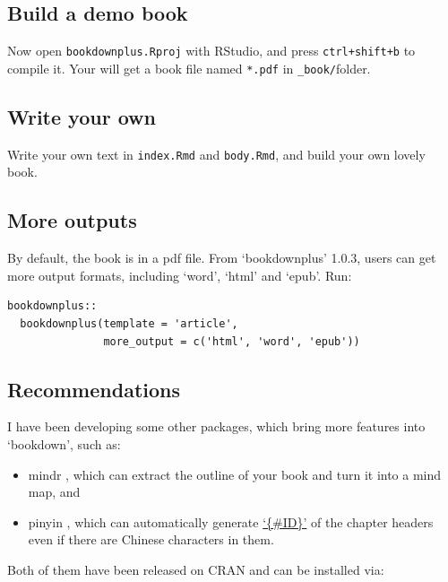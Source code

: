 \documentclass[]{book}
\theoremstyle{definition}
\theoremstyle{definition}
\theoremstyle{definition}
\theoremstyle{remark}
\begin{document}
\subsection{Build a demo book}\label{build-a-demo-book}

Now open \texttt{bookdownplus.Rproj} with RStudio, and press
\texttt{ctrl+shift+b} to compile it. Your will get a book file named
\texttt{*.pdf} in \texttt{\_book/}folder.

\subsection{Write your own}\label{write-your-own}

Write your own text in \texttt{index.Rmd} and \texttt{body.Rmd}, and
build your own lovely book.

\subsection{More outputs}\label{more-outputs}

By default, the book is in a pdf file. From `bookdownplus' 1.0.3, users
can get more output formats, including `word', `html' and `epub'. Run:

\begin{verbatim}
bookdownplus::
  bookdownplus(template = 'article', 
               more_output = c('html', 'word', 'epub'))
\end{verbatim}

\subsection{Recommendations}\label{recommendations}

I have been developing some other packages, which bring more features
into `bookdown', such as:

\begin{itemize}
\item
  mindr \citep{R-mindr}, which can extract the outline of your book and
  turn it into a mind map, and
\item
  pinyin \citep{R-pinyin}, which can automatically generate
  \href{https://bookdown.org/yihui/bookdown/cross-references.html}{`\{\#ID\}'}
  of the chapter headers even if there are Chinese characters in them.
\end{itemize}

Both of them have been released on CRAN and can be installed via:
\end{document}
